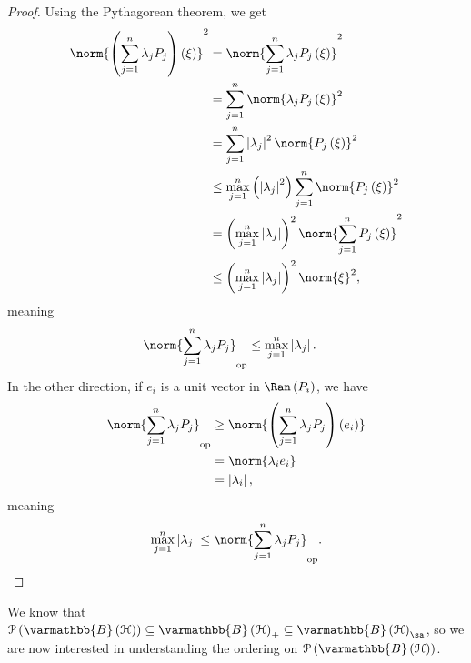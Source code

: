 \documentclass[10pt]{mypackage}
\renewcommand*{\mathbb}[1]{\varmathbb{#1}}
\newcommand{\B}{\mathbb{B}}
\begin{document}
\begin{proof}
  Using the Pythagorean theorem, we get
  \begin{align*}
    \norm{\left(\sum_{j=1}^{n}\lambda_jP_j\right)\left(\xi\right)}^2 &= \norm{\sum_{j=1}^{n}\lambda_jP_j\left(\xi\right)}^2\\
                                                                     &= \sum_{j=1}^{n}\norm{\lambda_jP_j\left(\xi\right)}^2\\
                                                                     &= \sum_{j=1}^{n}\left\vert \lambda_j \right\vert^2\norm{P_j\left(\xi\right)}^2\\
                                                                     &\leq \max_{j=1}^{n}\left(\left\vert \lambda_j \right\vert^2\right)\sum_{j=1}^{n}\norm{P_j\left(\xi\right)}^2\\
                                                                     &= \left(\max_{j=1}^{n} \left\vert \lambda_j \right\vert\right)^2\norm{\sum_{j=1}^{n}P_j\left(\xi\right)}^2\\
                                                                     &\leq \left(\max_{j=1}^{n}\left\vert \lambda_j \right\vert\right)^2\norm{\xi}^2,
  \end{align*}
  meaning
  \begin{align*}
    \norm{\sum_{j=1}^{n}\lambda_jP_j}_{\text{op}} &\leq \max_{j=1}^{n}\left\vert \lambda_j \right\vert.
  \end{align*}
  In the other direction, if $e_i$ is a unit vector in $\Ran\left(P_i\right)$, we have
  \begin{align*}
    \norm{\sum_{j=1}^{n}\lambda_jP_j}_{\text{op}} &\geq \norm{\left(\sum_{j=1}^{n}\lambda_jP_j\right)\left(e_i\right)}\\
                                                  &= \norm{\lambda_ie_i}\\
                                                  &= \left\vert \lambda_i \right\vert,
  \end{align*}
  meaning
  \begin{align*}
    \max_{j=1}^{n}\left\vert \lambda_j \right\vert \leq \norm{\sum_{j=1}^{n}\lambda_jP_j}_{\text{op}}.
  \end{align*}
\end{proof}
We know that $\mathcal{P}\left(\B\left(\mathcal{H}\right)\right)\subseteq \B\left(\mathcal{H}\right)_{+}\subseteq \B\left(\mathcal{H}\right)_{\sa}$, so we are now interested in understanding the ordering on $\mathcal{P}\left(\B\left(\mathcal{H}\right)\right)$.
\end{document}
